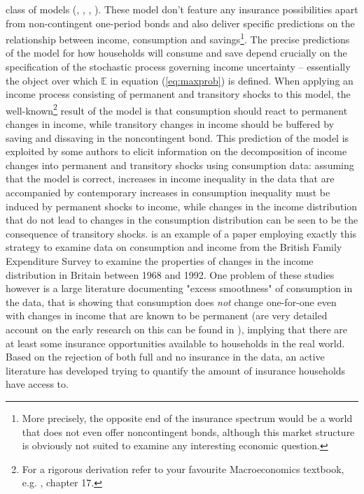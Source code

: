class of models (\citet{Aiyagari1994}, \citet{Bewley1977}, \citet{Huggett1993},
\citet{Imrohoroglu1989}). These model don't feature any insurance possibilities
apart from non-contingent one-period bonds and also deliver specific predictions
on the relationship between income, consumption and savings\footnote{More precisely,
the opposite end of the insurance spectrum would be a world that does not even
offer noncontingent bonds, although this market structure is obviously not suited
to examine any interesting economic question.}. The precise predictions of the 
model for how households will consume and save depend crucially on the specification
of the stochastic process governing income uncertainty -- essentially the object
over which $\mathbb{E}$ in equation (\ref{eq:maxprob}) is defined. When applying an
income process consisting of permanent and transitory shocks to this model, the 
well-known\footnote{For a rigorous derivation refer to your favourite Macroeconomics
textbook, e.g. \citet{LjungqvistSargent2012}, chapter 17.} result of the model is that consumption
should react to permanent changes in income, while transitory changes in income
should be buffered by saving and dissaving in the noncontingent bond. This 
prediction of the model is exploited by some authors to elicit information on 
the decomposition of income changes into permanent and transitory shocks using 
consumption data: assuming that the model is correct, increases in income 
inequality in the data that are accompanied by contemporary increases in consumption
inequality must be induced by permanent shocks to income, while changes in the 
income distribution that do not lead to changes in the consumption distribution
can be seen to be the consequence of transitory shocks. \citet{BlundellPreston1998}
is an example of a paper employing exactly this strategy to examine data 
on consumption and income from the British Family Expenditure Survey to examine
the properties of changes in the income distribution in Britain between 1968 
and 1992. One problem of these studies however is a large literature documenting 
"excess smoothness" of consumption in the data, that is showing that consumption
does \textit{not} change one-for-one even with changes in income that are known
to be permanent (are very detailed account on the early research on this can be
found in \citealt{Deaton1992book}), implying that there are at least some 
insurance opportunities available to households in the real world. Based on the 
rejection of both full and no insurance in the data, an active literature has 
developed trying to quantify the amount of insurance households have access to.
